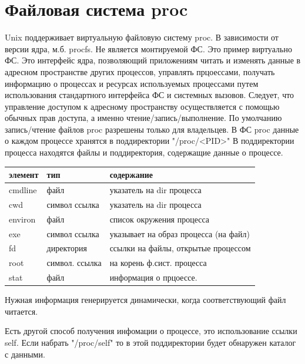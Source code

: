 \section{Файловая система proc}

Unix поддерживает виртуальную файловую систему proc. В зависимости от версии ядра, м.б. procfs. Не является монтируемой ФС. Это пример виртуально ФС. Это интерфейс ядра, позволяющий приложениям читать и изменять данные в адресном пространстве других процессов, управлять прцоессами, получать информацию о процессах и ресурсах используемых процессами путем использования стандартного интерфейса ФС и системных вызовов. Следует, что управление доступом к адресному пространству осуществляется с помощью обычных прав доступа, а именно чтение/запись/выполнение. По умолчанию запись/чтение файлов proc разрешены только для владельцев. В  ФС proc данные о каждом процессе хранятся в поддиректории "/proc/<PID>"
В поддиректории процесса находятся файлы и поддиректория, содержащие данные о процессе. 

\begin{table}[H]
\begin{tabular}{|l|l|l|}
\hline
элемент & тип & содержание \\
\hline
cmdline & файл & указатель на dir процесса \\
cwd & символ ссылка & указатель на dir процесса\\
environ & файл & список окружения процесса\\
exe & символ ссылка & указывает на образ процесса (на файл)\\
fd & директория & ссылки на файлы, открытые процессом\\
root & символ. ссылка & на корень ф.сист. процесса\\
stat & файл & информация о прцоессе.\\
\hline
\end{tabular}
\end{table}

Нужная информация генерируется динамически, когда соответствующий файл читается. 

Есть другой способ получения инфомации о процессе, это использование ссылки self. Если набрать "/proc/self"  то в этой поддиректории будет обнаружен каталог с данными.

 
